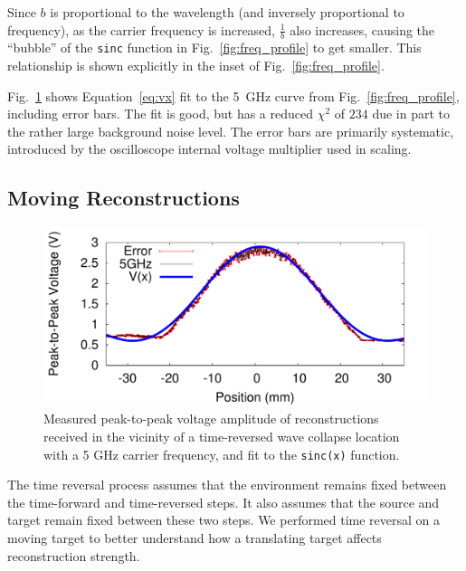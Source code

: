 \documentclass[conference]{IEEEtran}
\begin{document}
Since $b$ is proportional to the wavelength (and inversely proportional to
frequency), as the carrier frequency is increased, $\frac{1}{b}$ also increases,
causing the ``bubble'' of the \texttt{sinc} function in
Fig.~\ref{fig:freq_profile} to get smaller.
%
This relationship is shown explicitly in the inset of
Fig.~\ref{fig:freq_profile}.



Fig.~\ref{fig:error_fit} shows Equation~\ref{eq:vx} fit to the 5~GHz curve from
Fig.~\ref{fig:freq_profile}, including error bars.
%
The fit is good, but has a reduced $\chi^2$ of $234$ due in part to the rather
large background noise level.
%
The error bars are primarily systematic, introduced by the oscilloscope internal
voltage multiplier used in scaling.

\subsection{Moving Reconstructions}
\label{sec:moving}


\begin{figure}[t!]
\includegraphics[width=\columnwidth]{figs/fit.pdf}
\caption{Measured peak-to-peak voltage amplitude of reconstructions received in the
vicinity of a time-reversed wave collapse location with a 5 GHz carrier
frequency, and fit to the \texttt{sinc(x)} function.}
\label{fig:error_fit}
\end{figure}


The time reversal process assumes that the environment remains fixed between the
time-forward and time-reversed steps.
%
It also assumes that the source and target remain fixed between these two steps.
%
We performed time reversal on a moving target to better understand how a
translating target affects reconstruction strength.
\end{document}
